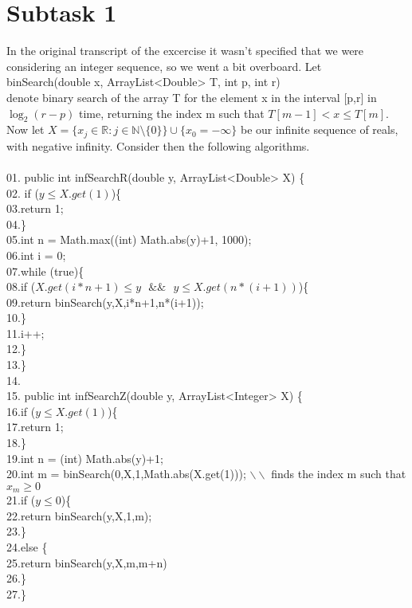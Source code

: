 \documentclass{article}
\theoremstyle{remark}
\numberwithin{equation}{section}
\begin{document}
\section*{Subtask 1}
In the original transcript of the excercise it wasn't specified that we were considering an integer sequence, so we went a bit overboard. Let
\\binSearch(double x, ArrayList<Double> T, int p, int r)
\\denote binary search of the array T for the element x in the interval [p,r] in $\log_2(r-p)$ time, returning the index m such that $T[m-1]<x\leq T[m]$.
\\Now let $X = \{ x_j \in\mathbb{R} : j\in\mathbb{N}\setminus\{0\} \} \cup \{x_0 = -\infty\}$ be our infinite sequence of reals, with negative infinity. Consider then the following algorithms.
\\\\01. public int infSearchR(double y, ArrayList<Double> X) \{
\\02. \indent if ($y\leq X.get(1)$)\{
\\03.\indent\indent return 1;
\\04.\indent\}
\\05.\indent int n = Math.max((int) Math.abs(y)+1, 1000);
\\06.\indent int i = 0;
\\07.\indent while (true)\{
\\08.\indent\indent if ($X.get(i*n+1) \leq y\text{ }\&\&\text{ } y \leq X.get(n*(i+1))$)\{
\\09.\indent\indent\indent return binSearch(y,X,i*n+1,n*(i+1));
\\10.\indent\indent\}
\\11.\indent\indent i++;
\\12.\indent\}
\\13.\}
\\14.\\15. public int infSearchZ(double y, ArrayList<Integer> X) \{
\\16.\indent if ($y\leq X.get(1)$)\{
\\17.\indent\indent return 1;
\\18.\indent\}
\\19.\indent int n = (int) Math.abs(y)+1;
\\20.\indent int m = binSearch(0,X,1,Math.abs(X.get(1))); $\backslash\backslash$ finds the index m such that $x_m\geq0$
\\21.\indent if ($y\leq 0$)\{
\\22.\indent\indent return binSearch(y,X,1,m);
\\23.\indent\}
\\24.\indent else \{
\\25.\indent\indent return binSearch(y,X,m,m+n)
\\26.\indent \}
\\27.\}
\end{document}
